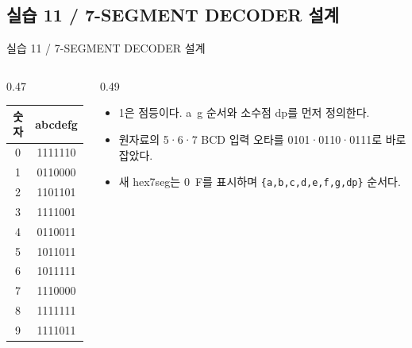 \documentclass[aspectratio=169,11pt]{beamer}
\newcommand{\sourceref}[1]{}
\begin{document}
\subsection{실습 11 / 7-SEGMENT DECODER 설계}
\begin{frame}[t]{실습 11 / 7-SEGMENT DECODER 설계}
\small
\begin{columns}[T,onlytextwidth]\begin{column}{0.47\textwidth}\begin{center}\renewcommand{\arraystretch}{1.12}\begin{tabular}{cc}\hline 숫자 & abcdefg\\\hline 0 & 1111110\\
1 & 0110000\\
2 & 1101101\\
3 & 1111001\\
4 & 0110011\\
5 & 1011011\\
6 & 1011111\\
7 & 1110000\\
8 & 1111111\\
9 & 1111011\\\hline\end{tabular}\end{center}\end{column}\begin{column}{0.49\textwidth}\begin{itemize}\setlength{\itemsep}{0.5em}\item 1은 점등이다. a~g 순서와 소수점 dp를 먼저 정의한다.
\item 원자료의 5·6·7 BCD 입력 오타를 0101·0110·0111로 바로잡았다.
\item 새 hex7seg는 0~F를 표시하며 \texttt{\{a,b,c,d,e,f,g,dp\}} 순서다.\end{itemize}\end{column}\end{columns}
\sourceref{4.1\_고급 조합논리 회로 설계, p.78, 79, 80}
\end{frame}
\end{document}
